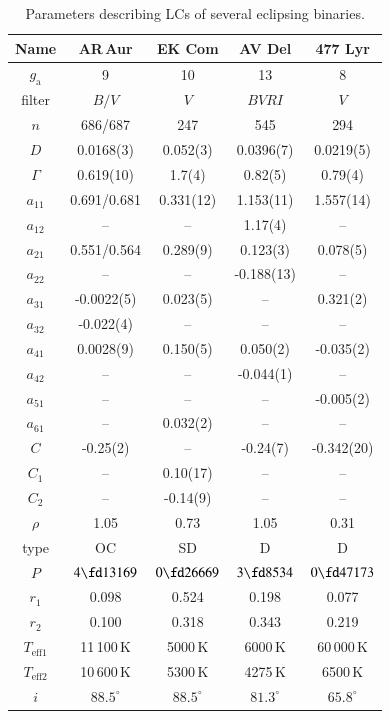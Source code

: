 \documentclass{aa}
\begin{document}
\begin{table}\small
\begin{center}
\caption{\small{Parameters describing LCs of several eclipsing binaries. }}\label{prm}
\begin{tabular}{ccccc}
\hline
  Name &AR\,Aur & EK Com & AV Del & 477 Lyr\\
   \hline
  $g_{\mathrm{a}}$ & 9 & 10 & 13 & 8 \\
  filter & $B/V$& $V$ & $BVRI$ & $V$ \\
  $n$ &686/687&247&545&294\\
  $D$ & 0.0168(3)& 0.052(3)& 0.0396(7) &0.0219(5) \\
  $\mathit{\Gamma}$ &0.619(10)& 1.7(4)&0.82(5)&0.79(4)\\
  $a_{11}$ &0.691/0.681&0.331(12)&1.153(11)&1.557(14)\\
  $a_{12}$ &--&--&1.17(4)&--\\
  $a_{21}$ &0.551/0.564&0.289(9)&0.123(3)&0.078(5)\\
  $a_{22}$ &--&--&-0.188(13)&--\\
  $a_{31}$ &-0.0022(5)&0.023(5)&--&0.321(2) \\
  $a_{32}$ &-0.022(4)&--&--&--\\
  $a_{41}$ &0.0028(9)&0.150(5)&0.050(2)&-0.035(2)\\
  $a_{42}$ &--&--&-0.044(1)&--\\
  $a_{51}$ &--&--&--&-0.005(2)\\
  $a_{61}$ &--&0.032(2)&--&--\\
  $C$ &-0.25(2)&--&-0.24(7)&-0.342(20)\\
  $C_{1}$ &--&0.10(17)&--&--  \\
  $C_{2}$ &--&-0.14(9)&--&--  \\
  $\rho$ & 1.05& 0.73& 1.05&0.31  \\
  \hline
  type&OC&SD&D&D\\
  $P$&$4\fd13169$&$0\fd26669$&$3\fd8534$&$0\fd47173$\\
  $r_1$ &0.098& 0.524& 0.198&0.077  \\
  $r_2$ &0.100& 0.318& 0.343&0.219  \\
  $T_{\mathrm{eff}1}$ &11\,100\,K& 5000\,K& 6000\,K&60\,000\,K \\
  $T_{\mathrm{eff}2}$ &10\,600\,K& 5300\,K& 4275\,K&6500\,K \\
  $i$ &$88.5^{\circ}$& $88.5^{\circ}$& $81.3^{\circ}$&$65.8^{\circ}$\\

\end{tabular}
\end{center}
\end{table}
\end{document}
